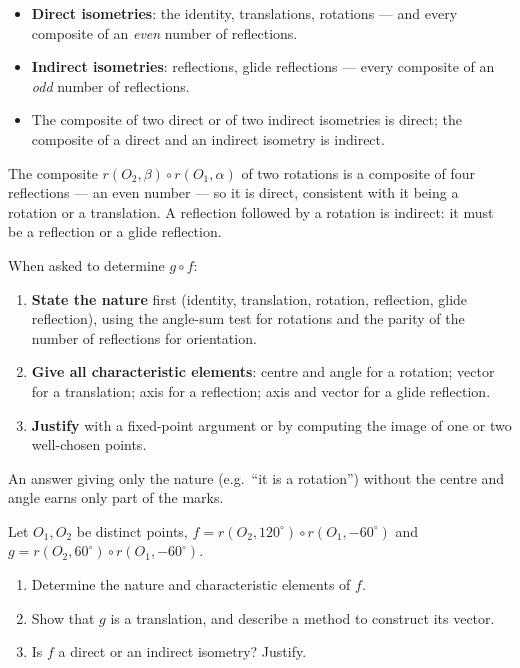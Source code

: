\documentclass[11pt]{article}
\begin{document}
\begin{aretenir}
\begin{itemize}
\item \textbf{Direct isometries}: the identity, translations, rotations — and every composite of an \emph{even} number of reflections.
\item \textbf{Indirect isometries}: reflections, glide reflections — every composite of an \emph{odd} number of reflections.
\item The composite of two direct or of two indirect isometries is direct; the composite of a direct and an indirect isometry is indirect.
\end{itemize}
\end{aretenir}

\begin{exemplebox}
The composite $r(O_2,\beta)\circ r(O_1,\alpha)$ of two rotations is a composite of four reflections — an even number — so it is direct, consistent with it being a rotation or a translation. A reflection followed by a rotation is indirect: it must be a reflection or a glide reflection.
\end{exemplebox}

\begin{methode}
When asked to determine $g \circ f$:
\begin{enumerate}
\item \textbf{State the nature} first (identity, translation, rotation, reflection, glide reflection), using the angle-sum test for rotations and the parity of the number of reflections for orientation.
\item \textbf{Give all characteristic elements}: centre and angle for a rotation; vector for a translation; axis for a reflection; axis and vector for a glide reflection.
\item \textbf{Justify} with a fixed-point argument or by computing the image of one or two well-chosen points.
\end{enumerate}
An answer giving only the nature (e.g.\ ``it is a rotation'') without the centre and angle earns only part of the marks.
\end{methode}

\begin{exercice}[Practice]
Let $O_1, O_2$ be distinct points, $f = r(O_2, 120^\circ) \circ r(O_1, -60^\circ)$ and $g = r(O_2, 60^\circ) \circ r(O_1, -60^\circ)$.
\begin{enumerate}
\item Determine the nature and characteristic elements of $f$.
\item Show that $g$ is a translation, and describe a method to construct its vector.
\item Is $f$ a direct or an indirect isometry? Justify.
\end{enumerate}
\end{exercice}
\end{document}
